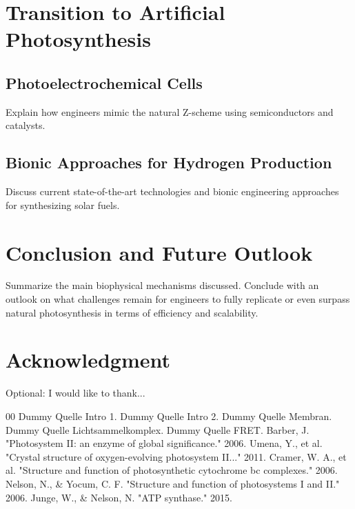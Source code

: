 \documentclass[conference]{IEEEtran}
\begin{document}
\section{Transition to Artificial Photosynthesis}
\subsection{Photoelectrochemical Cells}
Explain how engineers mimic the natural Z-scheme using semiconductors and catalysts.

\subsection{Bionic Approaches for Hydrogen Production}
Discuss current state-of-the-art technologies and bionic engineering approaches for synthesizing solar fuels.

\section{Conclusion and Future Outlook}
Summarize the main biophysical mechanisms discussed. Conclude with an outlook on what challenges remain for engineers to fully replicate or even surpass natural photosynthesis in terms of efficiency and scalability.

\section*{Acknowledgment}
Optional: I would like to thank...

\begin{thebibliography}{00}
 Dummy Quelle Intro 1.
 Dummy Quelle Intro 2.
 Dummy Quelle Membran.
 Dummy Quelle Lichtsammelkomplex.
 Dummy Quelle FRET.
 Barber, J. "Photosystem II: an enzyme of global significance." 2006.
 Umena, Y., et al. "Crystal structure of oxygen-evolving photosystem II..." 2011.
 Cramer, W. A., et al. "Structure and function of photosynthetic cytochrome bc complexes." 2006.
 Nelson, N., \& Yocum, C. F. "Structure and function of photosystems I and II." 2006.
 Junge, W., \& Nelson, N. "ATP synthase." 2015.
\end{thebibliography}
\end{document}
